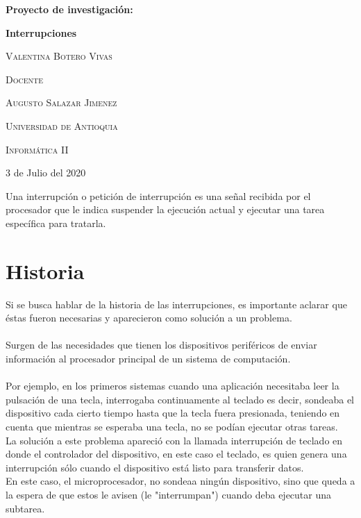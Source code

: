 \documentclass{report}   %
\begin{document}
\begin{titlepage}    %
	\centering
	{\huge\bfseries Proyecto de investigación: \par}
	\vspace{1cm}
	{\huge\bfseries  Interrupciones \par}
    \vspace{3cm}
    {\scshape\large Valentina Botero Vivas \par}
    \vspace{3cm}
      {\scshape\large Docente  \par}
	\vspace{0.5cm}
    {\scshape\large Augusto Salazar Jimenez  \par}
	\vspace{3cm}
	 {\scshape\large Universidad de Antioquia \par}
	\vspace{1cm}
    {\scshape\large Informática II  \par}
	\vspace{1cm}
	{\large 3 de Julio del 2020 \par}
\end{titlepage}


Una interrupción o petición de interrupción es una señal recibida por el procesador que le indica suspender la ejecución actual y ejecutar una tarea específica para tratarla.\\


\section*{Historia}
Si se busca hablar de la historia de las interrupciones, es importante aclarar que éstas fueron necesarias y aparecieron como solución a un problema.\\\\
Surgen de las necesidades que tienen los dispositivos periféricos de enviar información al procesador principal de un sistema de computación.\\\\ Por ejemplo, en los primeros sistemas cuando una aplicación necesitaba leer la pulsación de una tecla, interrogaba continuamente al teclado es decir, sondeaba el dispositivo cada cierto tiempo hasta que la tecla fuera presionada, teniendo en cuenta que mientras se esperaba una tecla, no se podían ejecutar otras tareas.\\ La solución a este problema apareció con la llamada interrupción de teclado en donde el controlador del dispositivo, en este caso el teclado, es quien genera una interrupción sólo cuando el dispositivo está listo para transferir datos.\\ En este caso, el microprocesador, no sondeaa ningún dispositivo, sino que queda a la espera de que estos le avisen (le "interrumpan") cuando deba ejecutar una subtarea.
\end{document}
